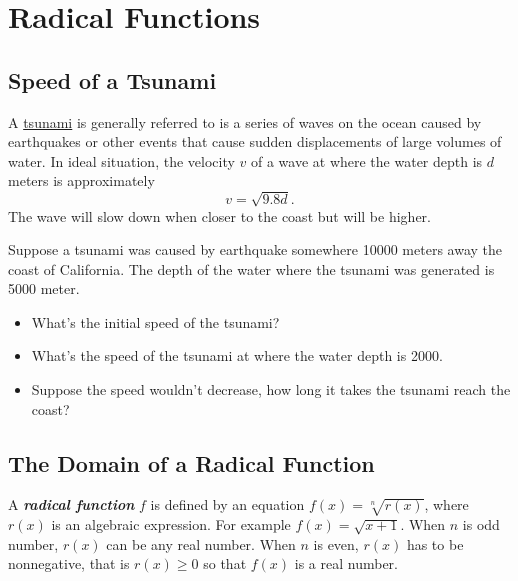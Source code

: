 \documentclass[
  en,11pt]{elegantbook}
\providecommand{\tightlist}{%
  \setlength{\itemsep}{0pt}\setlength{\parskip}{0pt}}
\newcommand{\size}[2]{{\fontsize{#1}{0}\selectfont#2}}
\newenvironment{rmdthink}{
	\vspace*{0.5\baselineskip}
	\par\noindent
	\makebox[-4pt][r]{\color{green!90}\size{12}{\faLightbulbO}\,\,}
    \begin{tcolorbox}[
    enhanced,
    title={\textbf{\color{second}Think}},
    title style={left color=blue!10!green!20!white,right color=yellow!20!blue!20!white},
    colback=green!20!white,
    ]
    \sffamily
}{
    \end{tcolorbox}
	\par\ignorespacesafterend
}
\begin{document}
\hypertarget{radical-functions}{%
\chapter{Radical Functions}\label{radical-functions}}

\hypertarget{speed-of-a-tsunami}{%
\section{Speed of a Tsunami}\label{speed-of-a-tsunami}}

\begin{rmdthink}

A \href{https://en.wikipedia.org/wiki/Tsunami}{tsunami} is generally referred to is a series of waves on the ocean caused by earthquakes or other events that cause sudden displacements of large volumes of water. In ideal situation, the velocity \(v\) of a wave at where the water depth is \(d\) meters is approximately
\[
v=\sqrt{9.8d}.
\]
The wave will slow down when closer to the coast but will be higher.

Suppose a tsunami was caused by earthquake somewhere 10000 meters away the coast of California. The depth of the water where the tsunami was generated is 5000 meter.

\begin{itemize}
\tightlist
\item
  What's the initial speed of the tsunami?
\item
  What's the speed of the tsunami at where the water depth is 2000.
\item
  Suppose the speed wouldn't decrease, how long it takes the tsunami reach the coast?
\end{itemize}

\end{rmdthink}

\hypertarget{the-domain-of-a-radical-function}{%
\section{The Domain of a Radical Function}\label{the-domain-of-a-radical-function}}

A \textbf{\emph{radical function}} \(f\) is defined by an equation \(f(x)=\sqrt[n]{r(x)}\), where \(r(x)\) is an algebraic expression. For example \(f(x)=\sqrt{x+1}\). When \(n\) is odd number, \(r(x)\) can be any real number. When \(n\) is even, \(r(x)\) has to be nonnegative, that is \(r(x)\geq 0\) so that \(f(x)\) is a real number.
\end{document}
